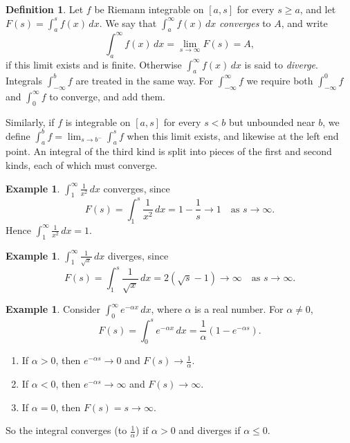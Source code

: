 \documentclass[11pt,a4paper]{article}
\numberwithin{equation}{section}
\theoremstyle{definition}
\newtheorem{defn}[thm]{Definition}
\newtheorem{exa}[thm]{Example}
\begin{document}
\begin{defn}
Let $f$ be Riemann integrable on $[a,s]$ for every $s\geq a$, and let $F(s) = \int^s_af(x)\,dx$. We say that $\int^{\infty}_af(x)\,dx$ \emph{converges} to $A$, and write
$$\int^{\infty}_af(x)\,dx = \lim_{s\rightarrow \infty} F(s) = A,$$
if this limit exists and is finite. Otherwise $\int^{\infty}_af(x)\,dx$ is said to \emph{diverge}. Integrals $\int_{-\infty}^b f$ are treated in the same way. For $\int_{-\infty}^\infty f$ we require both $\int_{-\infty}^0 f$ and $\int_0^\infty f$ to converge, and add them.

Similarly, if $f$ is integrable on $[a,s]$ for every $s<b$ but unbounded near $b$, we define $\int_a^bf = \lim_{s\rightarrow b^-}\int_a^sf$ when this limit exists, and likewise at the left end point. An integral of the third kind is split into pieces of the first and second kinds, each of which must converge.
\end{defn}


\begin{exa}
$\int^{\infty}_1\frac{1}{x^2}\, dx$ converges, since
$$F(s) = \int^s_1 \frac{1}{x^2}\, dx = 1 - \frac{1}{s} \longrightarrow 1 \quad\text{as } s\longrightarrow\infty .$$
Hence $\int^{\infty}_1\frac{1}{x^2}\, dx = 1$.
\end{exa}


\begin{exa}
$\int^{\infty}_1\frac{1}{\sqrt{x}}\, dx$ diverges, since
$$F(s)  = \int^s_1\frac{1}{\sqrt{x}}\,dx = 2(\sqrt{s} - 1) \longrightarrow \infty \quad\text{as } s \longrightarrow \infty .$$
\end{exa}


\begin{exa}
Consider $\int^{\infty}_0e^{-\alpha x}\, dx$, where $\alpha$ is a real number. For $\alpha\neq0$,
$$F(s) = \int^s_0e^{-\alpha x}\, dx = \frac{1}{\alpha} (1  - e^{-\alpha s}) .$$
\begin{enumerate}
\item[(i)] If $\alpha > 0$, then $e^{-\alpha s}\longrightarrow0$ and $F(s)\longrightarrow\frac{1}{\alpha}$.
\item[(ii)] If $\alpha < 0$, then $e^{-\alpha s}\longrightarrow\infty$ and $F(s)\longrightarrow\infty$.
\item[(iii)] If $\alpha = 0$, then $F(s) = s\longrightarrow\infty$.
\end{enumerate}
So the integral converges (to $\frac{1}{\alpha}$) if $\alpha > 0$ and diverges if $\alpha \leq 0$.
\end{exa}
\end{document}
